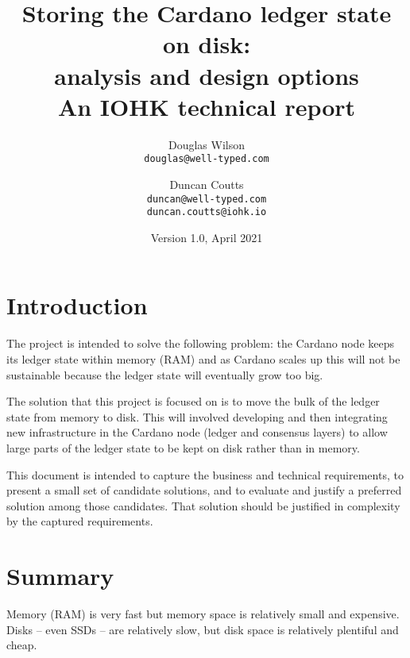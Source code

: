 \documentclass[11pt,a4paper]{article}
\begin{document}
\title{Storing the Cardano ledger state on disk: \\
       analysis and design options \\
       {\large \sc An IOHK technical report}
  }
\date{Version 1.0, April 2021}
\author{Douglas Wilson     \\ {\small \texttt{douglas@well-typed.com}} \\
   \and Duncan Coutts      \\ {\small \texttt{duncan@well-typed.com}} \\
                              {\small \texttt{duncan.coutts@iohk.io}}
   }

\maketitle

\section{Introduction}
\label{introduction}

The project is intended to solve the following problem: the Cardano node keeps
its ledger state within memory (RAM) and as Cardano scales up this will not be
sustainable because the ledger state will eventually grow too big.

The solution that this project is focused on is to move the bulk of the ledger
state from memory to disk. This will involved developing and then integrating
new infrastructure in the Cardano node (ledger and consensus layers) to allow
large parts of the ledger state to be kept on disk rather than in memory.

This document is intended to capture the business and technical requirements,
to present a small set of candidate solutions, and to evaluate and justify a
preferred solution among those candidates. That solution should be justified in
complexity by the captured requirements.

\tableofcontents


\section{Summary}
\label{summary}

Memory (RAM) is very fast but memory space is relatively small and expensive.
Disks -- even SSDs -- are relatively slow, but disk space is relatively
plentiful and cheap.
\end{document}
